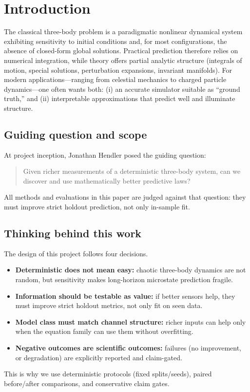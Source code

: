 \documentclass[11pt]{article}
\begin{document}
\section{Introduction}
The classical three-body problem is a paradigmatic nonlinear dynamical system exhibiting sensitivity to initial conditions and, for most configurations, the absence of closed-form global solutions. Practical prediction therefore relies on numerical integration, while theory offers partial analytic structure (integrals of motion, special solutions, perturbation expansions, invariant manifolds). For modern applications---ranging from celestial mechanics to charged particle dynamics---one often wants both: (i) an accurate simulator suitable as ``ground truth,'' and (ii) interpretable approximations that predict well and illuminate structure.

\subsection*{Guiding question and scope}
At project inception, Jonathan Hendler posed the guiding question:
\begin{quote}
Given richer measurements of a deterministic three-body system, can we discover and use mathematically better predictive laws?
\end{quote}
All methods and evaluations in this paper are judged against that question: they must improve strict holdout prediction, not only in-sample fit.

\subsection*{Thinking behind this work}
The design of this project follows four decisions.
\begin{itemize}
\item \textbf{Deterministic does not mean easy:} chaotic three-body dynamics are not random, but sensitivity makes long-horizon microstate prediction fragile.
\item \textbf{Information should be testable as value:} if better sensors help, they must improve strict holdout metrics, not only fit on seen data.
\item \textbf{Model class must match channel structure:} richer inputs can help only when the equation family can use them without overfitting.
\item \textbf{Negative outcomes are scientific outcomes:} failures (no improvement, or degradation) are explicitly reported and claim-gated.
\end{itemize}
This is why we use deterministic protocols (fixed splits/seeds), paired before/after comparisons, and conservative claim gates.
\end{document}
